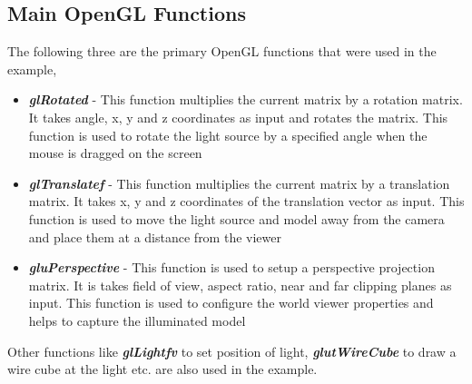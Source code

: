 \documentclass[11pt,a4paper,oneside]{article}
\begin{document}
   \subsection{Main OpenGL Functions}
   The following three are the primary OpenGL functions that were used in the example,
   \begin{itemize}
   	\item \textbf{\emph{glRotated}} - This function multiplies the current matrix by a rotation matrix. It takes angle, x, y and z coordinates as input and rotates the matrix. This function is used to rotate the light source by a specified angle when the mouse is dragged on the screen
   	\item \textbf{\emph{glTranslatef}} - This function multiplies the current matrix by a translation matrix. It takes x, y and z coordinates of the translation vector as input. This function is used to move the light source and model away from the camera and place them at a distance from the viewer
   	\item \textbf{\emph{gluPerspective}} - This function is used to setup a perspective projection matrix. It is takes field of view, aspect ratio, near and far clipping planes as input. This function is used to configure the world viewer properties and helps to capture the illuminated model
   \end{itemize}
   Other functions like \textbf{\emph{glLightfv}} to set position of light, \textbf{\emph{glutWireCube}} to draw a wire cube at the light etc. are also used in the example.
   
   \pagebreak
	
\end{document}
